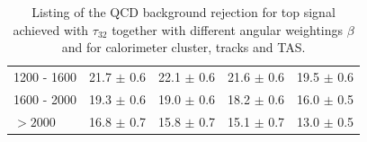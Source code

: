 \begin{table}[]
\begin{tabular}{lllll}
\multicolumn{1}{l||}{1200 - 1600}    & \multicolumn{1}{l|}{21.7 $\pm$ 0.6}      					& \multicolumn{1}{l|}{22.1 $\pm$ 0.6} & \multicolumn{1}{l|}{21.6 $\pm$ 0.6} & \multicolumn{1}{l|}{19.5 $\pm$ 0.6} \\
\multicolumn{1}{l||}{1600 - 2000}    & \multicolumn{1}{l|}{19.3 $\pm$ 0.6}      	& \multicolumn{1}{l|}{19.0 $\pm$ 0.6} 					& \multicolumn{1}{l|}{18.2 $\pm$ 0.6} & \multicolumn{1}{l|}{16.0 $\pm$ 0.5} \\
\multicolumn{1}{l||}{$>2000$}        & \multicolumn{1}{l|}{16.8 $\pm$ 0.7}      	& \multicolumn{1}{l|}{15.8 $\pm$ 0.7} 					& \multicolumn{1}{l|}{15.1 $\pm$ 0.7} & \multicolumn{1}{l|}{13.0 $\pm$ 0.5} \\ \hline
\end{tabular}
\caption{Listing of the QCD background rejection for top signal achieved with $\tau_{32}$ together with different angular weightings $\beta$ and for calorimeter cluster, tracks and TAS.}\label{table:top_scan}
\end{table}

